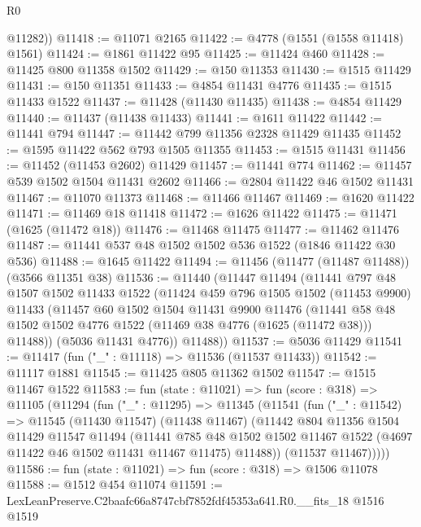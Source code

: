 \begin{lexlean}{R0}
\begin{coremodule}
        @11282))
@11418 := @11071 @2165
@11422 := @4778 (@1551 (@1558 @11418) @1561)
@11424 := @1861 @11422 @95
@11425 := @11424 @460
@11428 := @11425 @800 @11358 @1502
@11429 := @150 @11353
@11430 := @1515 @11429
@11431 := @150 @11351
@11433 := @4854 @11431 @4776
@11435 := @1515 @11433 @1522
@11437 := @11428 (@11430 @11435)
@11438 := @4854 @11429
@11440 := @11437 (@11438 @11433)
@11441 := @1611 @11422
@11442 := @11441 @794
@11447 := @11442 @799 @11356 @2328 @11429 @11435
@11452 := @1595 @11422 @562 @793 @1505 @11355
@11453 := @1515 @11431
@11456 := @11452 (@11453 @2602) @11429
@11457 := @11441 @774
@11462 := @11457 @539 @1502 @1504 @11431 @2602
@11466 := @2804 @11422 @46 @1502 @11431
@11467 := @11070 @11373
@11468 := @11466 @11467
@11469 := @1620 @11422
@11471 := @11469 @18 @11418
@11472 := @1626 @11422
@11475 := @11471 (@1625 (@11472 @18))
@11476 := @11468 @11475
@11477 := @11462 @11476
@11487 := @11441 @537 @48 @1502 @1502 @536 @1522 (@1846 @11422 @30 @536)
@11488 := @1645 @11422
@11494 := @11456 (@11477 (@11487 @11488)) (@3566 @11351 @38)
@11536 := @11440
    (@11447
      @11494
      (@11441
        @797
        @48
        @1507
        @1502
        @11433
        @1522
        (@11424
          @459
          @796
          @1505
          @1502
          (@11453 @9900)
          @11433
          (@11457
            @60
            @1502
            @1504
            @11431
            @9900
            @11476
            (@11441 @58 @48 @1502 @1502 @4776 @1522 (@11469 @38 @4776 (@1625 (@11472 @38))) @11488))
          (@5036 @11431 @4776))
        @11488))
@11537 := @5036 @11429
@11541 := @11417 (fun ("_" : @11118) => @11536 (@11537 @11433))
@11542 := @11117 @1881
@11545 := @11425 @805 @11362 @1502
@11547 := @1515 @11467 @1522
@11583 := fun (state : @11021) =>
  fun (score : @318) =>
  @11105
    (@11294
      (fun ("_" : @11295) =>
      @11345
        (@11541
          (fun ("_" : @11542) =>
          @11545
            (@11430 @11547)
            (@11438 @11467)
            (@11442
              @804
              @11356
              @1504
              @11429
              @11547
              @11494
              (@11441
                @785
                @48
                @1502
                @1502
                @11467
                @1522
                (@4697 @11422 @46 @1502 @11431 @11467 @11475)
                @11488))
            (@11537 @11467)))))
@11586 := fun (state : @11021) => fun (score : @318) => @1506 @11078
@11588 := @1512 @454 @11074
@11591 := LexLeanPreserve.C2baafc66a8747cbf7852fdf45353a641.R0.__fits_18 @1516 @1519

\end{coremodule}
\end{lexlean}
